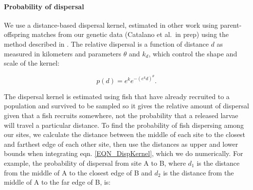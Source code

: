 \documentclass[12pt, oneside]{article}   	%
\begin{document}

\paragraph*{Probability of dispersal}

We use a distance-based dispersal kernel, estimated in other work using parent-offspring matches from our genetic data (Catalano et al.\ in prep) using the method described in \cite{bode2018estimating}. The relative dispersal is a function of distance $d$ as measured in kilometers and parameters $\theta$ and $k_d$, which control the shape and scale of the kernel:

\begin{equation}
p(d) = e^k e^{-(e^k d)^\theta}. \label{EQN_DispKernel}
\end{equation}

The dispersal kernel is estimated using fish that have already recruited to a population and survived to be sampled so it gives the relative amount of dispersal given that a fish recruits somewhere, not the probability that a released larvae will travel a particular distance. To find the probability of fish dispersing among our sites, we calculate the distance between the middle of each site to the closest and farthest edge of each other site, then use the distances as upper and lower bounds when integrating eqn. \ref{EQN_DispKernel}, which we do numerically. For example, the probability of dispersal from site A to B, where $d_1$ is the distance from the middle of A to the closest edge of B and $d_2$ is the distance from the middle of A to the far edge of B, is:

\end{document}
